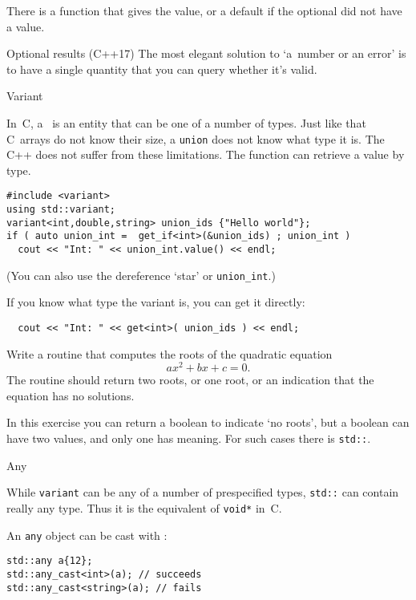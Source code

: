 There is a function  that gives the value, or
a default if the optional did not have a value.

\begin{slide}{Optional results (C++17)}
  \label{sl:optional-root}
  The most elegant solution to `a~number or an error' is to have a
  single quantity that you can query whether it's valid.
\end{slide}

 {Variant}
\label{sec:stl-variant}

In~C, a~ is an entity that can be one of a number
of types. Just like that C~arrays do not know their size, a
\lstinline{union} does not know what type it is. The C++
 does not suffer from these limitations. The
function  can retrieve a value by type.

\begin{lstlisting}
#include <variant>
using std::variant;
variant<int,double,string> union_ids {"Hello world"};
if ( auto union_int =  get_if<int>(&union_ids) ; union_int )
  cout << "Int: " << union_int.value() << endl;
\end{lstlisting}
(You can also use the dereference `star' or \lstinline{union_int}.)

If you know what type the variant is, you
can get it directly:
\begin{lstlisting}
  cout << "Int: " << get<int>( union_ids ) << endl;
\end{lstlisting}

\begin{exercise}
  Write a routine that computes the roots of the quadratic equation
  \[ ax^2+bx+c=0. \]
  The routine should return two roots, or one root, or an indication
  that the equation has no solutions.
\end{exercise}

In this exercise you can return a boolean to indicate `no roots', but
a boolean can have two values, and only one has meaning. For such
cases there is \lstinline{std::}.

 {Any}
\label{sec:stl-any}

While \lstinline{variant} can be any of a number of prespecified
types, \lstinline{std::} can contain really any
type. Thus it is the equivalent of \lstinline{void*} in~C.

An \lstinline{any} object can be cast with :
\begin{lstlisting}
std::any a{12};
std::any_cast<int>(a); // succeeds
std::any_cast<string>(a); // fails
\end{lstlisting}

